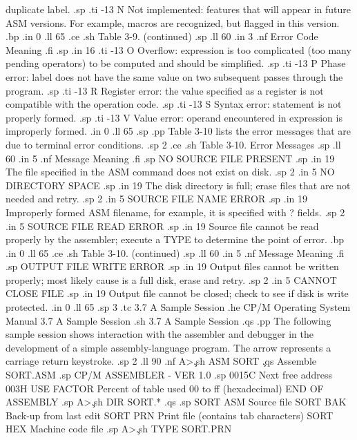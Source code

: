 duplicate label.
.sp
.ti -13
N            Not implemented:  features that will appear in future ASM 
versions.  For example, macros are recognized, but flagged in this 
version.
.bp
.in 0
.ll 65
.ce
.sh
Table 3-9.  (continued)
.sp
.ll 60
.in 3
.nf
Error Code                       Meaning
.fi
.sp
.in 16
.ti -13
O            Overflow:  expression is too complicated (too many 
pending operators) to be computed and should be simplified.
.sp
.ti -13
P            Phase error:  label does not have the same value on two 
subsequent passes through the program.
.sp
.ti -13
R            Register error:  the value specified as a register is not 
compatible with the operation code.
.sp
.ti -13
S            Syntax error:  statement is not properly formed.
.sp
.ti -13
V            Value error:  operand encountered in expression is 
improperly formed.
.in 0
.ll 65
.sp
.pp
Table 3-10 lists the error messages that are due to terminal error 
conditions.
.sp 2
.ce
.sh
Table 3-10.  Error Messages
.sp
.ll 60
.in 5
.nf
Message       Meaning
.fi
.sp
NO SOURCE FILE PRESENT
.sp
.in 19
The file specified in the ASM command does not exist on disk.
.sp 2
.in 5
NO DIRECTORY SPACE
.sp
.in 19
The disk directory is full; erase files that are not needed and retry.
.sp 2
.in 5
SOURCE FILE NAME ERROR
.sp
.in 19
Improperly formed ASM filename, for example, it is specified with ? fields.
.sp 2
.in 5
SOURCE FILE READ ERROR
.sp
.in 19
Source file cannot be read properly by the assembler; execute a
TYPE to determine the point of error.
.bp
.in 0
.ll 65
.ce
.sh
Table 3-10.  (continued)
.sp
.ll 60
.in 5
.nf
Message       Meaning
.fi
.sp
OUTPUT FILE WRITE ERROR
.sp
.in 19
Output files cannot be written properly; most likely cause is a full
disk, erase and retry.
.sp 2
.in 5
CANNOT CLOSE FILE
.sp
.in 19
Output file cannot be closed; check to see if disk is write protected.
.in 0
.ll 65
.sp 3
.tc    3.7  A Sample Session
.he CP/M Operating System Manual                3.7  A Sample Session
.sh
3.7  A Sample Session
.qs
.pp
The following sample session shows interaction with the assembler and 
debugger in the development of a simple assembly-language 
program.  The arrow represents a carriage return keystroke.
.sp 2
.ll 90
.nf
A>\c
.sh
ASM SORT      \c
.qs
Assemble SORT.ASM
.sp
CP/M ASSEMBLER - VER 1.0
.sp
0015C    Next free address
003H USE FACTOR    Percent of table used 00 to ff (hexadecimal)
END OF ASSEMBLY
.sp
A>\c
.sh
DIR SORT.*
.qs
.sp
SORT  ASM    Source file
SORT  BAK    Back-up from last edit
SORT  PRN    Print file (contains tab characters)
SORT  HEX    Machine code file
.sp
A>\c
.sh
TYPE SORT.PRN
